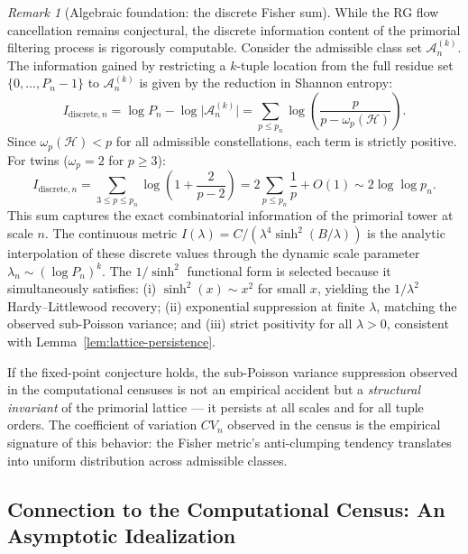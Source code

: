 \documentclass[11pt]{article}
\theoremstyle{remark}
\newtheorem{remark}[theorem]{Remark}
\begin{document}
\begin{remark}[Algebraic foundation: the discrete Fisher sum]
While the RG flow cancellation remains conjectural, the discrete
information content of the primorial filtering process is rigorously
computable. Consider the admissible class set $\mathcal{A}_n^{(k)}$.
The information gained by restricting a $k$-tuple location from the
full residue set $\{0, \ldots, P_n-1\}$ to $\mathcal{A}_n^{(k)}$ is
given by the reduction in Shannon entropy:
\begin{equation}
I_{\text{discrete}, n} = \log P_n - \log \bigl|\mathcal{A}_n^{(k)}\bigr|
= \sum_{p \leq p_n} \log\!\left(\frac{p}{p - \omega_p(\mathcal{H})}\right).
\end{equation}
Since $\omega_p(\mathcal{H}) < p$ for all admissible constellations,
each term is strictly positive. For twins ($\omega_p=2$ for $p \geq 3$):
\begin{equation}
I_{\text{discrete}, n} = \sum_{3 \leq p \leq p_n} \log\!\left(1 + \frac{2}{p-2}\right)
= 2 \sum_{p \leq p_n} \frac{1}{p} + O(1) \sim 2 \log \log p_n.
\end{equation}
This sum captures the exact combinatorial information of the primorial
tower at scale $n$. The continuous metric $I(\lambda) = C/(\lambda^4
\sinh^2(B/\lambda))$ is the analytic interpolation of these discrete
values through the dynamic scale parameter $\lambda_n \sim (\log
P_n)^k$. The $1/\sinh^2$ functional form is selected because it
simultaneously satisfies: (i) $\sinh^2(x) \sim x^2$ for small $x$,
yielding the $1/\lambda^2$ Hardy--Littlewood recovery; (ii) exponential
suppression at finite $\lambda$, matching the observed sub-Poisson
variance; and (iii) strict positivity for all $\lambda > 0$, consistent
with Lemma~\ref{lem:lattice-persistence}.
\end{remark}

If the fixed-point conjecture holds, the sub-Poisson variance
suppression observed in the computational censuses is not an empirical
accident but a \emph{structural invariant} of the primorial lattice
— it persists at all scales and for all tuple orders. The coefficient
of variation $CV_n$ observed in the census is the empirical signature
of this behavior: the Fisher metric's anti-clumping tendency translates
into uniform distribution across admissible classes.

\subsection{Connection to the Computational Census: An Asymptotic Idealization}
\end{document}
